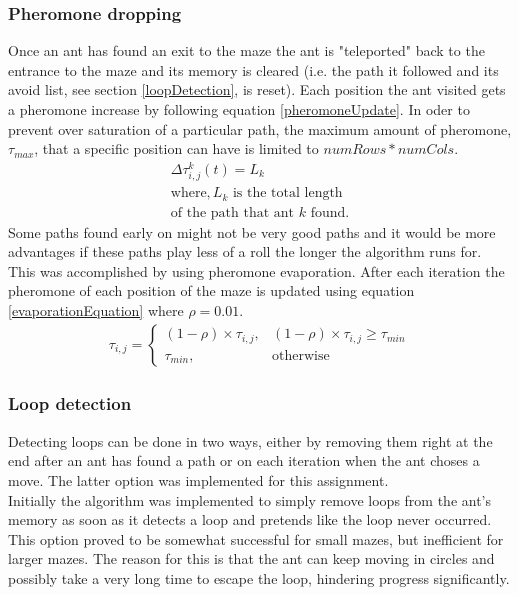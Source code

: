 \documentclass[hidelinks,english,conference]{IEEEtran}
\begin{document}
    \subsubsection{Pheromone dropping}
	Once an ant has found an exit to the maze the ant is "teleported" back to the entrance to the maze and its memory is cleared (i.e. the path it followed and its avoid list, see section \ref{loopDetection}, is reset). Each position the ant visited gets a pheromone increase by following equation \ref{pheromoneUpdate}. In oder to prevent over saturation of a particular path, the maximum amount of pheromone, $\tau_{max}$, that a specific position can have is limited to $numRows * numCols$. 
    \begin{equation}
    	\label{pheromoneUpdate}
        \begin{split}
          \Delta\tau_{i,j}^{k}(t) = L_{k}\\
          \text{where}, L_{k} \text{ is the total length}\\ \text{of the path that ant } k \text{ found.}
        \end{split}
    \end{equation}
    Some paths found early on might not be very good paths and it would be more advantages if these paths play less of a roll the longer the algorithm runs for. This was accomplished by using pheromone evaporation.  After each iteration the pheromone of each position of the maze is updated using equation \ref{evaporationEquation} where $\rho=0.01$.
      \begin{align}\label{evaporationEquation}
  \tau_{i,j}= 
  \begin{cases}
		(1-\rho) \times \tau_{i,j} ,& (1-\rho) \times \tau_{i,j} \geq \tau_{min}\\
  		\tau_{min},              & \text{otherwise}
  \end{cases}
  \end{align}
  
    \subsubsection{Loop detection\label{loopDetection}}
	Detecting loops can be done in two ways, either by removing them right at the end after an ant has found a path or on each iteration when the ant choses a move. The latter option was implemented for this assignment.\\
    
    Initially the algorithm was implemented to simply remove loops from the ant's memory as soon as it detects a loop and pretends like the loop never occurred. This option proved to be somewhat successful for small mazes, but inefficient for larger mazes. The reason for this is that the ant can keep moving in circles and possibly take a very long time to escape the loop, hindering progress significantly.\\
    
\end{document}

